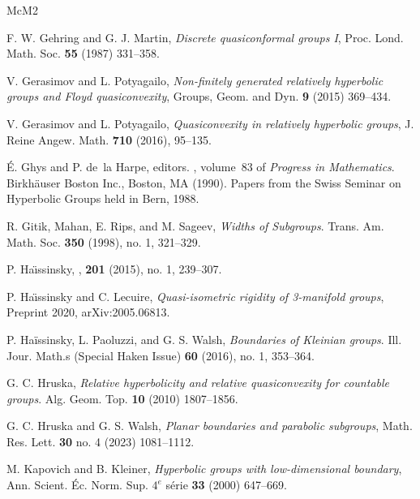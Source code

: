 \documentclass[11pt]{article}
\theoremstyle{definition}
\begin{document}
\begin{thebibliography}{McM2}


 F. W. Gehring and G. J. Martin, {\it Discrete quasiconformal groups I}, Proc. Lond. Math. Soc. {\bf 55} (1987) 331--358.

 V. Gerasimov and L. Potyagailo, {\it Non-finitely generated relatively hyperbolic groups and Floyd quasiconvexity}, Groups, Geom. and Dyn. {\bf 9} (2015) 369--434.  

 V. Gerasimov and L. Potyagailo, {\it Quasiconvexity in relatively hyperbolic
groups}, J. Reine Angew. Math. {\bf 710} (2016), 95--135. 



{\'E}. Ghys and P. de~la Harpe, editors.
,
  volume~83 of {\em Progress in Mathematics}.
\newblock Birkh\"auser Boston Inc., Boston, MA (1990).
\newblock Papers from the Swiss Seminar on Hyperbolic Groups held in Bern,
  1988.

 R. Gitik, Mahan, E. Rips, and M. Sageev, {\it Widths of Subgroups}.  Trans. Am. Math. Soc. {\bf 350} (1998), no. 1, 321--329. 

P. Ha{\"{\i}}ssinsky,
,
 {\bf 201} (2015), no. 1, 239--307. 

P. Ha{\"{\i}}ssinsky and C. Lecuire,
{\it Quasi-isometric rigidity of 3-manifold groups}, 
\newblock Preprint 2020, arXiv:2005.06813. 


  P. Ha\"issinsky,  L. Paoluzzi, and G. S. Walsh, {\it Boundaries of Kleinian groups}. Ill.  Jour. Math.s (Special Haken Issue)  {\bf 60} (2016), no. 1, 353--364. 

 G. C. Hruska, {\it Relative hyperbolicity and relative quasiconvexity for countable groups}. Alg. Geom. Top. {\bf 10} (2010) 1807--1856. 

 G. C. Hruska and G. S. Walsh, {\it Planar boundaries and parabolic subgroups}, Math. Res. Lett. {\bf 30} no. 4 (2023) 1081--1112. 

 M. Kapovich and B. Kleiner, {\it Hyperbolic groups with low-dimensional boundary}, Ann. Scient. \'Ec. Norm. Sup. $4^e$ s\'erie {\bf 33} (2000) 647--669.



\end{thebibliography}
\end{document}
